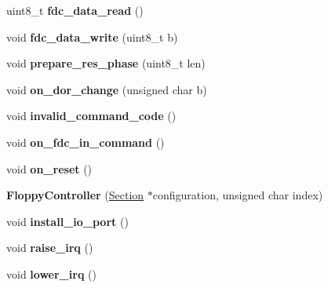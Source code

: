 \begin{DoxyCompactItemize}
\item 
\hypertarget{classFloppyController_af66f11dac96a180777cb40119170558a}{uint8\-\_\-t {\bfseries fdc\-\_\-data\-\_\-read} ()}\label{classFloppyController_af66f11dac96a180777cb40119170558a}

\item 
\hypertarget{classFloppyController_a286e6697307521d2359f8f17ae53b30b}{void {\bfseries fdc\-\_\-data\-\_\-write} (uint8\-\_\-t b)}\label{classFloppyController_a286e6697307521d2359f8f17ae53b30b}

\item 
\hypertarget{classFloppyController_af6109e74b547dba1cc2c7f999ec1dae0}{void {\bfseries prepare\-\_\-res\-\_\-phase} (uint8\-\_\-t len)}\label{classFloppyController_af6109e74b547dba1cc2c7f999ec1dae0}

\item 
\hypertarget{classFloppyController_af3a14c5fbbbeba2e99d93a82bb4d68a8}{void {\bfseries on\-\_\-dor\-\_\-change} (unsigned char b)}\label{classFloppyController_af3a14c5fbbbeba2e99d93a82bb4d68a8}

\item 
\hypertarget{classFloppyController_a09582cc4d601a0f9d10de755cd45536f}{void {\bfseries invalid\-\_\-command\-\_\-code} ()}\label{classFloppyController_a09582cc4d601a0f9d10de755cd45536f}

\item 
\hypertarget{classFloppyController_a85985bfd263e73e410be50a6fe9d0cd3}{void {\bfseries on\-\_\-fdc\-\_\-in\-\_\-command} ()}\label{classFloppyController_a85985bfd263e73e410be50a6fe9d0cd3}

\item 
\hypertarget{classFloppyController_a2d17aad1dbcd65d815cdbad1463b9d8e}{void {\bfseries on\-\_\-reset} ()}\label{classFloppyController_a2d17aad1dbcd65d815cdbad1463b9d8e}

\item 
\hypertarget{classFloppyController_a94198f8d6635bbbad16c54bb8837717c}{{\bfseries Floppy\-Controller} (\hyperlink{classSection}{Section} $\ast$configuration, unsigned char index)}\label{classFloppyController_a94198f8d6635bbbad16c54bb8837717c}

\item 
\hypertarget{classFloppyController_a94fdb6876c90cb26c8df44dff3074a13}{void {\bfseries install\-\_\-io\-\_\-port} ()}\label{classFloppyController_a94fdb6876c90cb26c8df44dff3074a13}

\item 
\hypertarget{classFloppyController_a3a78477511b7fdbb8400f3ce5b931e74}{void {\bfseries raise\-\_\-irq} ()}\label{classFloppyController_a3a78477511b7fdbb8400f3ce5b931e74}

\item 
\hypertarget{classFloppyController_a4a16e8af2ed357fc837709a88673dfe3}{void {\bfseries lower\-\_\-irq} ()}\label{classFloppyController_a4a16e8af2ed357fc837709a88673dfe3}

\end{DoxyCompactItemize}
